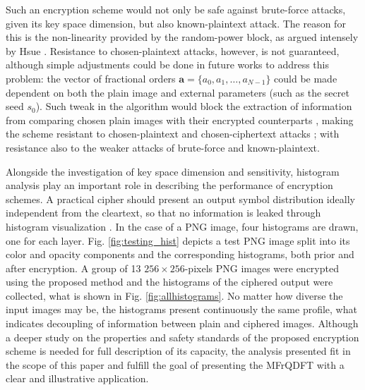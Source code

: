 Such an encryption scheme would not only be safe against brute-force attacks, given its key space dimension, but also known-plaintext attack. The reason for this is the non-linearity provided by the random-power block, as argued intensely by Hsue \cite{hsue2018enhancing}. Resistance to chosen-plaintext attacks, however, is not guaranteed, although simple adjustments could be done in future works to address this problem: the vector of fractional orders $ \mathbf{a} = \{ a_0, a_1, \dots, a_{N-1} \} $ could be made dependent on both the plain image and external parameters (such as the secret seed $ s_0 $). Such tweak in the algorithm would block the extraction of information from comparing chosen plain images with their encrypted counterparts \cite{chai2019color, hu2017chaotic, murugan2016image}, making the scheme resistant to chosen-plaintext and chosen-ciphertext attacks \cite{wang2012novel}; with resistance also to the weaker attacks of brute-force and known-plaintext.

Alongside the investigation of key space dimension and sensitivity, histogram analysis play an important role in describing the performance of encryption schemes. A practical cipher should present an output symbol distribution ideally independent from the cleartext, so that no information is leaked through histogram visualization  \cite{zhang2014symmetric}.
In the case of a PNG image, four histograms are drawn, one for each layer. Fig. \ref{fig:testing_hist} depicts a test PNG image split into its color and opacity components and the corresponding histograms, both prior and after encryption. A group of 13 $ 256\times 256 $-pixels PNG images were encrypted using the proposed method and the histograms of the ciphered output were collected, what is shown in Fig. \ref{fig:allhistograms}. No matter how diverse the input images may be, the histograms present continuously the same profile, what indicates decoupling of information between plain and ciphered images. Although a deeper study on the properties and safety standards of the proposed encryption scheme is needed for full description of its capacity, the analysis presented fit in the scope of this paper and fulfill the goal of presenting the MFrQDFT with a clear and illustrative application.


